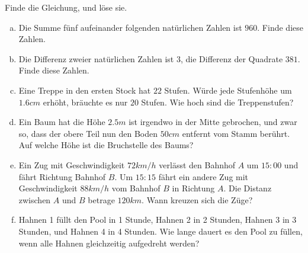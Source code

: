 \documentclass[%
11pt,%
twoside,%
titlepage,%
german,%
headsepline%
]{scrartcl}
\begin{document}
\begin{ueb} Finde die Gleichung, und löse sie.
                \begin{enumerate}[a)]
                                \item Die Summe fünf aufeinander folgenden natürlichen Zahlen ist $960$. Finde diese Zahlen.
                                \item Die Differenz zweier natürlichen Zahlen ist $3$, die Differenz der Quadrate $381$. Finde diese Zahlen.
                                \item Eine Treppe in den ersten Stock hat $22$ Stufen. Würde jede Stufenhöhe um $1.6 cm$ erhöht, bräuchte es nur $20$ Stufen. Wie hoch sind die Treppenstufen?
                                \item Ein Baum hat die Höhe $2.5 m$ ist irgendwo in der Mitte gebrochen, und zwar so, dass der obere Teil nun den Boden $50 cm$ entfernt vom Stamm berührt. Auf welche Höhe ist die Bruchstelle des Baums?
                                \item Ein Zug mit Geschwindigkeit $72 km/h$ verlässt den Bahnhof $A$ um $15:00$ und fährt Richtung Bahnhof $B$. Um $15:15$ fährt ein andere Zug mit Geschwindigkeit $88km/h$ vom Bahnhof $B$ in Richtung $A$. Die Distanz zwischen $A$ und $B$ betrage $120 km$. Wann kreuzen sich die Züge?
                                \item Hahnen 1 füllt den Pool in 1 Stunde, Hahnen 2 in 2 Stunden, Hahnen 3 in 3 Stunden, und Hahnen 4 in 4 Stunden. Wie lange dauert es den Pool zu füllen, wenn alle Hahnen gleichzeitig aufgedreht werden?
                \end{enumerate}
\end{ueb}
\end{document}
